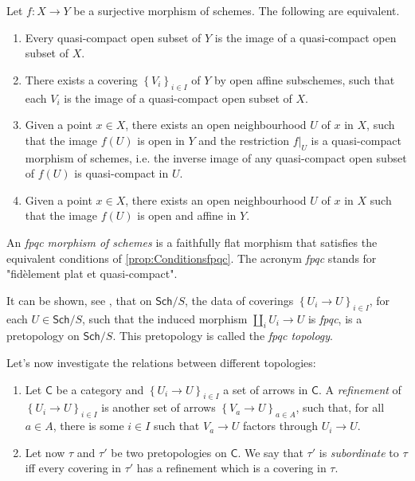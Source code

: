 \begin{prop}\label{prop:Conditionsfpqc}
	Let $f\colon X \to Y$ be a surjective morphism of schemes. The following are equivalent.
\begin{enumerate}
	\item Every quasi-compact open subset of $Y$ is the image of a quasi-compact
		open subset of $X$.
	\item There exists a covering $\left\{ V_i \right\}_{i \in I}$ of $Y$ by open affine 
		subschemes, such that each $V_i$ is the image of a quasi-compact
		open subset of $X$.
	\item Given a point $x \in X$, there exists an open neighbourhood $U$ of $x$
		in $X$, such that the image $f(U)$ is open in $Y$ and the restriction
		$\left.f\right|_{U}$ is a quasi-compact morphism of schemes, i.e.
		the inverse image of any quasi-compact open subset of $f(U)$ is
		quasi-compact in $U$.
	\item Given a point $x \in X$, there exists an open neighbourhood $U$ of $x$
		in $X$ such that the image $f(U)$ is open and affine in $Y$.
\end{enumerate}
\end{prop}


\begin{defn}
	An \emph{fpqc morphism of schemes} is a faithfully flat morphism
	that satisfies the equivalent conditions of \cref{prop:Conditionsfpqc}.
	The acronym \emph{fpqc} stands for "fidèlement plat et quasi-compact".
\end{defn}


\begin{rem}
	It can be shown, see \cite[\S 2.3.2]{Vistoli},
	that on $\mathsf{Sch}/S    $, the data
	of coverings $\left\{ U_{ i } \to U \right\}_{ i \in I }$, for each $U \in \mathsf{Sch}/S$,
	such that the induced morphism $\amalg_i U_i \to U$ is \emph{fpqc},
	is a pretopology on $\mathsf{Sch}/S$.
	This pretopology is called the \emph{fpqc topology}.
\end{rem}


\noindent
Let's now investigate the relations between different topologies:
\begin{defn}\leavevmode\vspace{-\baselineskip}
\begin{enumerate}
\item Let $\mathsf{C}$ be a category and $\left\{ U_{ i } \to U \right\}_{ i \in I }$
	a set of arrows in $\mathsf{C}$.
	A \emph{refinement} of $\left\{ U_{ i } \to U \right\}_{ i \in I }$ is
	another set of arrows $\left\{ V_{ a } \to U \right\}_{ a \in A }$,
	such that, for all $a \in A$, there is some $i \in I$ such that
	$V_a \to U$ factors through $U_i \to U$.


\item Let now $\tau$ and $\tau'$ be two pretopologies on $\mathsf{C}$.
	We say that $\tau'$ is \emph{subordinate} to $\tau$ iff
	every covering in $\tau'$ has a refinement which is
	a covering in $\tau$.
\end{enumerate}
\end{defn}


